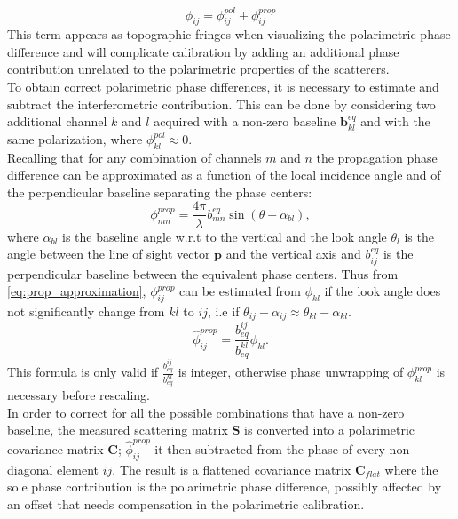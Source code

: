 \begin{equation}
	\phi_{ij} = \phi_{ij}^{pol} + \phi_{ij}^{prop}
\end{equation}
This term appears as topographic fringes when visualizing the polarimetric phase difference and will complicate calibration by adding an additional phase contribution unrelated to the polarimetric properties of the scatterers.\\
To obtain correct polarimetric phase differences, it is necessary to estimate and subtract the interferometric contribution. This can be done  by considering two additional channel $k$ and $l$  acquired with  a non-zero baseline $\mathbf{b}_{kl}^{eq}$ and with the same polarization, where $\phi_{kl}^{pol} \approx 0$.\\ Recalling that for any combination of channels $m$ and $n$ the propagation phase difference can be approximated as a function of the local incidence angle and of the perpendicular baseline separating the phase centers:
\begin{equation}\label{eq:prop_approximation}
		\phi_{mn}^{prop} = \frac{4\pi}{\lambda} b_{mn}^{eq} \sin(\theta - \alpha_{bl}),
\end{equation}
where $\alpha_{bl}$ is the baseline angle w.r.t to the vertical and the look angle $\theta_l$ is the angle between the line of sight vector $\mathbf{p}$ and the vertical axis and $b_{ij}^{eq}$ is the perpendicular baseline between the equivalent phase centers.
Thus from \autoref{eq:prop_approximation}, $\phi_{ij}^{prop}$ can be estimated from $\phi_{kl}$ if the look angle does not significantly change from $kl$ to $ij$, i.e if $\theta_{ij} - \alpha_{ij} \approx \theta_{kl} - \alpha_{kl}$. 
\begin{equation}
	\hat{\phi}_{ij}^{prop} = \frac{b_{eq}^{ij}}{b_{eq}^{kl}} \phi_{kl}.
\end{equation}
This formula is only valid if $\frac{b_{eq}^{ij}}{b_{eq}^{kl}}$ is integer\cite{Massonnet1996}, otherwise phase unwrapping of $\phi_{kl}^{prop}$ is necessary before rescaling.\\
In order to correct for all the possible combinations that have a non-zero baseline, the measured scattering matrix $\mathbf{S}$ is converted into a polarimetric covariance matrix $\mathbf{C}$;  $\hat{\phi}_{ij}^{prop}$ it then subtracted from the phase of every non-diagonal element $ij$. The result is a flattened covariance matrix $\mathbf{C}_{flat}$ where the sole phase contribution is the polarimetric phase difference, possibly affected by an offset that needs compensation in the polarimetric calibration.\\

